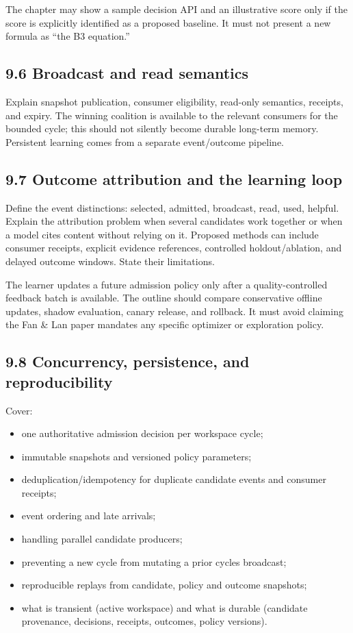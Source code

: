 The chapter may show a sample decision API and an illustrative score only if the score is explicitly identified as a proposed baseline. It must not present a new formula as ``the B3 equation.''

\subsection{9.6 Broadcast and read semantics}\label{96-broadcast-and-read-semantics}

Explain snapshot publication, consumer eligibility, read-only semantics, receipts, and expiry. The winning coalition is available to the relevant consumers for the bounded cycle; this should not silently become durable long-term memory. Persistent learning comes from a separate event/outcome pipeline.

\subsection{9.7 Outcome attribution and the learning loop}\label{97-outcome-attribution-and-the-learning-loop}

Define the event distinctions: selected, admitted, broadcast, read, used, helpful. Explain the attribution problem when several candidates work together or when a model cites content without relying on it. Proposed methods can include consumer receipts, explicit evidence references, controlled holdout/ablation, and delayed outcome windows. State their limitations.

The learner updates a future admission policy only after a quality-controlled feedback batch is available. The outline should compare conservative offline updates, shadow evaluation, canary release, and rollback. It must avoid claiming the Fan \& Lan paper mandates any specific optimizer or exploration policy.

\subsection{9.8 Concurrency, persistence, and reproducibility}\label{98-concurrency-persistence-and-reproducibility}

Cover:

\begin{itemize}
\tightlist
\item
  one authoritative admission decision per workspace cycle;
\item
  immutable snapshots and versioned policy parameters;
\item
  deduplication/idempotency for duplicate candidate events and consumer receipts;
\item
  event ordering and late arrivals;
\item
  handling parallel candidate producers;
\item
  preventing a new cycle from mutating a prior cycle\textquotesingle s broadcast;
\item
  reproducible replays from candidate, policy and outcome snapshots;
\item
  what is transient (active workspace) and what is durable (candidate provenance, decisions, receipts, outcomes, policy versions).
\end{itemize}

